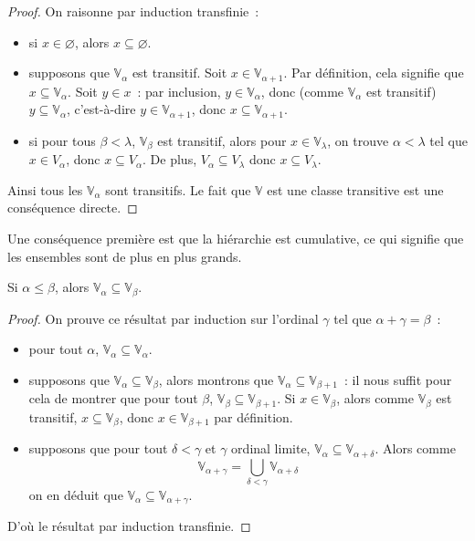 \begin{proof}
  On raisonne par induction transfinie~:
  \begin{itemize}
  \item si $x\in \varnothing$, alors $x\subseteq\varnothing$.
  \item supposons que $\mathbb V_\alpha$ est transitif. Soit
    $x\in\mathbb V_{\alpha+1}$. Par définition, cela signifie que
    $x\subseteq \mathbb V_\alpha$. Soit $y\in x$~: par inclusion,
    $y\in \mathbb V_\alpha$, donc (comme $\mathbb V_\alpha$ est transitif)
    $y\subseteq \mathbb V_\alpha$, c'est-à-dire $y\in \mathbb V_{\alpha + 1}$,
    donc $x\subseteq \mathbb V_{\alpha + 1}$.
  \item si pour tous $\beta < \lambda$, $\mathbb V_\beta$ est transitif, alors
    pour $x\in \mathbb V_\lambda$, on trouve $\alpha < \lambda$ tel que
    $x\in V_\alpha$, donc $x\subseteq V_\alpha$. De plus,
    $V_\alpha \subseteq V_\lambda$ donc $x\subseteq V_\lambda$.
  \end{itemize}
  Ainsi tous les $\mathbb V_\alpha$ sont transitifs. Le fait que $\mathbb V$ est
  une classe transitive est une conséquence directe.
\end{proof}

Une conséquence première est que la hiérarchie est cumulative, ce qui signifie
que les ensembles sont de plus en plus grands.

\begin{property}
  Si $\alpha \leq \beta$, alors $\mathbb V_\alpha\subseteq \mathbb V_\beta$.
\end{property}

\begin{proof}
  On prouve ce résultat par induction sur l'ordinal $\gamma$ tel que
  $\alpha + \gamma = \beta$~:
  \begin{itemize}
  \item pour tout $\alpha$, $\mathbb V_\alpha \subseteq \mathbb V_\alpha$.
  \item supposons que $\mathbb V_\alpha \subseteq \mathbb V_\beta$, alors
    montrons que $\mathbb V_\alpha \subseteq \mathbb V_{\beta+1}$~: il nous
    suffit pour cela de montrer que pour tout $\beta$,
    $\mathbb V_\beta \subseteq \mathbb V_{\beta + 1}$. Si $x \in \mathbb V_\beta$,
    alors comme $\mathbb V_\beta$ est transitif, $x\subseteq \mathbb V_\beta$,
    donc $x\in \mathbb V_{\beta + 1}$ par définition.
  \item supposons que pour tout $\delta < \gamma$ et $\gamma$ ordinal limite,
    $\mathbb V_\alpha \subseteq \mathbb V_{\alpha + \delta}$. Alors
    comme
    \[\mathbb V_{\alpha + \gamma} =
    \bigcup_{\delta < \gamma} \mathbb V_{\alpha + \delta}\]
    on en déduit que $\mathbb V_\alpha \subseteq \mathbb V_{\alpha + \gamma}$.
  \end{itemize}
  D'où le résultat par induction transfinie.
\end{proof}

